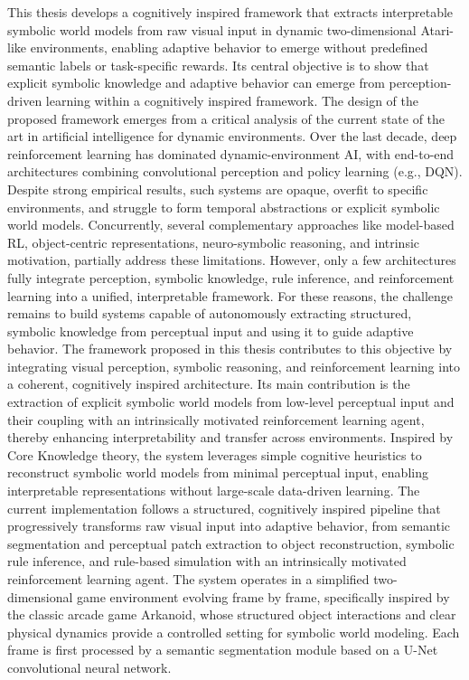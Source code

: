 \documentclass[12pt,a4paper]{report}
\begin{document}
This thesis develops a cognitively inspired framework that extracts interpretable symbolic world models from raw visual input in dynamic two-dimensional Atari-like environments, enabling adaptive behavior to emerge without predefined semantic labels or task-specific rewards.
Its central objective is to show that explicit symbolic knowledge and adaptive behavior can emerge from perception-driven learning within a cognitively inspired framework.
The design of the proposed framework emerges from a critical analysis of the current state of the art in artificial intelligence for dynamic environments. Over the last decade, deep reinforcement learning has dominated dynamic-environment AI, with end-to-end architectures combining convolutional perception and policy learning (e.g., DQN). Despite strong empirical results, such systems are opaque, overfit to specific environments, and struggle to form temporal abstractions or explicit symbolic world models. Concurrently, several complementary approaches like model-based RL, object-centric representations, neuro-symbolic reasoning, and intrinsic motivation, partially address these limitations.  However, only a few architectures fully integrate perception, symbolic knowledge, rule inference, and reinforcement learning into a unified, interpretable framework. For these reasons, the challenge remains to build systems capable of autonomously extracting structured, symbolic knowledge from perceptual input and using it to guide adaptive behavior.
The framework proposed in this thesis contributes to this objective by integrating visual perception, symbolic reasoning, and reinforcement learning into a coherent, cognitively inspired architecture. Its main contribution is the extraction of explicit symbolic world models from low-level perceptual input and their coupling with an intrinsically motivated reinforcement learning agent, thereby enhancing interpretability and transfer across environments. Inspired by Core Knowledge theory, the system leverages simple cognitive heuristics to reconstruct symbolic world models from minimal perceptual input, enabling interpretable representations without large-scale data-driven learning. The current implementation follows a structured, cognitively inspired pipeline that progressively transforms raw visual input into adaptive behavior, from semantic segmentation and perceptual patch extraction to object reconstruction, symbolic rule inference, and rule-based simulation with an intrinsically motivated reinforcement learning agent. The system operates in a simplified two-dimensional game environment evolving frame by frame, specifically inspired by the classic arcade game Arkanoid, whose structured object interactions and clear physical dynamics provide a controlled setting for symbolic world modeling. Each frame is first processed by a semantic segmentation module based on a U-Net convolutional neural network. 
\end{document}
